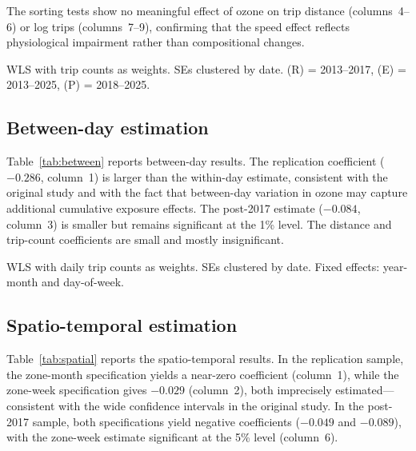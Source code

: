 \documentclass[12pt]{article}
\begin{document}
The sorting tests show no meaningful effect of ozone on trip distance (columns~4--6) or log trips (columns~7--9), confirming that the speed effect reflects physiological impairment rather than compositional changes.

\begin{table}[H]
\centering
\caption{Within-day estimation.}
\label{tab:within}


\medskip
\footnotesize WLS with trip counts as weights. SEs clustered by date. (R) = 2013--2017, (E) = 2013--2025, (P) = 2018--2025.
\end{table}


\subsection{Between-day estimation}

Table~\ref{tab:between} reports between-day results. The replication coefficient ($-0.286$, column~1) is larger than the within-day estimate, consistent with the original study and with the fact that between-day variation in ozone may capture additional cumulative exposure effects. The post-2017 estimate ($-0.084$, column~3) is smaller but remains significant at the 1\% level. The distance and trip-count coefficients are small and mostly insignificant.

\begin{table}[H]
\centering
\caption{Between-day estimation.}
\label{tab:between}


\medskip
\footnotesize WLS with daily trip counts as weights. SEs clustered by date. Fixed effects: year-month and day-of-week.
\end{table}


\subsection{Spatio-temporal estimation}

Table~\ref{tab:spatial} reports the spatio-temporal results. In the replication sample, the zone-month specification yields a near-zero coefficient (column~1), while the zone-week specification gives $-0.029$ (column~2), both imprecisely estimated---consistent with the wide confidence intervals in the original study. In the post-2017 sample, both specifications yield negative coefficients ($-0.049$ and $-0.089$), with the zone-week estimate significant at the 5\% level (column~6).
\end{document}
